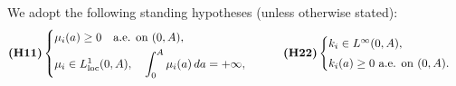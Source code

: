 \documentclass[10pt, a4paper]{amsart}
\theoremstyle{plain}
\theoremstyle{definition}
\theoremstyle{remark}
\numberwithin{equation}{section}
\def\to{\rightarrow}
\begin{document}
We adopt the following standing hypotheses (unless otherwise stated):
\begin{align*}
\textbf{(H11)}\begin{cases}
\mu_i(a)\geq 0 \quad \text{a.e. on }(0,A), \\[0.3em]
\mu_i \in L^1_{\rm loc}(0,A), \quad \displaystyle\int_0^{A}\mu_i(a)\,da = +\infty,
\end{cases}
\qquad
\textbf{(H22)}\begin{cases}
k_i \in L^\infty(0,A),  \\[0.3em]
k_i(a)\ge 0 \ \text{a.e. on } (0,A).
\end{cases}
\end{align*}
\end{document}
